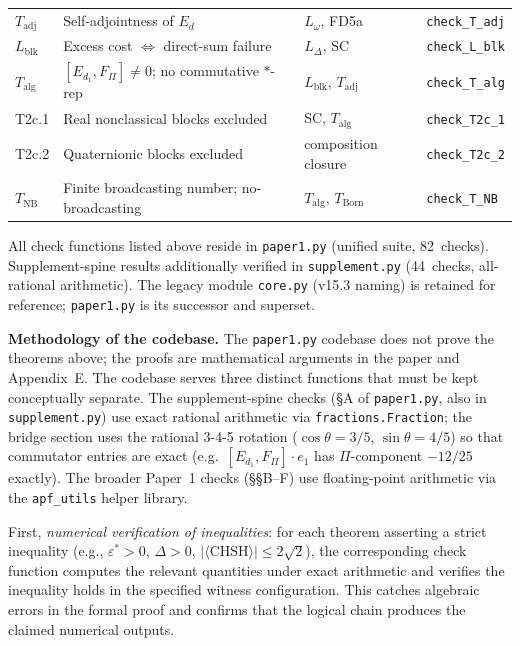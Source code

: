 \documentclass[11pt]{article}
\theoremstyle{remark}
\begin{document}
\begin{center}
\begin{tabular}{@{}lp{4.2cm}p{3.5cm}l@{}}
$T_{\mathrm{adj}}$ & Self-adjointness of $E_d$ & $L_\omega$, FD5a & \texttt{check\_T\_adj} \\
$L_{\mathrm{blk}}$ & Excess cost $\Leftrightarrow$ direct-sum failure & $L_\Delta$, SC & \texttt{check\_L\_blk} \\
$T_{\mathrm{alg}}$ & $[E_{d_1}, F_\Pi] \ne 0$; no commutative $*$-rep & $L_{\mathrm{blk}}$, $T_{\mathrm{adj}}$ & \texttt{check\_T\_alg} \\
T2c.1 & Real nonclassical blocks excluded & SC, $T_{\mathrm{alg}}$ & \texttt{check\_T2c\_1} \\
T2c.2 & Quaternionic blocks excluded & composition closure & \texttt{check\_T2c\_2} \\
$T_{\mathrm{NB}}$ & Finite broadcasting number; no-broadcasting & $T_{\mathrm{alg}}$, $T_{\mathrm{Born}}$ & \texttt{check\_T\_NB} \\
\bottomrule
\end{tabular}
\label{tab:theorem_register}
\end{center}

All check functions listed above reside in \texttt{paper1.py} (unified suite, 82~checks).  Supplement-spine results additionally verified in \texttt{supplement.py} (44~checks, all-rational arithmetic).  The legacy module \texttt{core.py} (v15.3 naming) is retained for reference; \texttt{paper1.py} is its successor and superset.

\smallskip\noindent\textbf{Methodology of the codebase.}  The \texttt{paper1.py} codebase does not prove the theorems above; the proofs are mathematical arguments in the paper and Appendix~E.  The codebase serves three distinct functions that must be kept conceptually separate.  The supplement-spine checks (\S{}A of \texttt{paper1.py}, also in \texttt{supplement.py}) use exact rational arithmetic via \texttt{fractions.Fraction}; the bridge section uses the rational 3-4-5 rotation ($\cos\theta = 3/5$, $\sin\theta = 4/5$) so that commutator entries are exact (e.g.\ $[E_{d_1}, F_\Pi]\cdot e_1$ has $\Pi$-component $-12/25$ exactly).  The broader Paper~1 checks (\S{}\S{}B--F) use floating-point arithmetic via the \texttt{apf\_utils} helper library.

First, \emph{numerical verification of inequalities}: for each theorem asserting a strict inequality (e.g., $\varepsilon^* > 0$, $\Delta > 0$, $|\langle \mathrm{CHSH} \rangle| \le 2\sqrt{2}$), the corresponding check function computes the relevant quantities under exact arithmetic and verifies the inequality holds in the specified witness configuration.  This catches algebraic errors in the formal proof and confirms that the logical chain produces the claimed numerical outputs.
\end{document}
